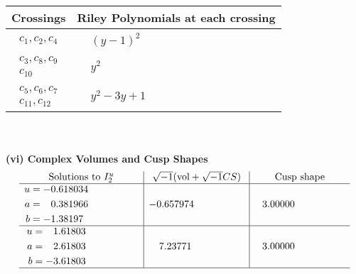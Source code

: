 \documentclass[1p]{elsarticle_modified}
\theoremstyle{definition}
\newcommand{\I}{\sqrt{-1}}
\begin{document}
\begin{tabular}{m{50pt}|m{274pt}}
Crossings & \hspace{64pt}Riley Polynomials at each crossing \\
\hline $$\begin{aligned}c_{1},c_{2},c_{4}\end{aligned}$$&$\begin{aligned}
&(y-1)^2
\end{aligned}$\\
\hline $$\begin{aligned}c_{3},c_{8},c_{9}\\c_{10}\end{aligned}$$&$\begin{aligned}
&y^2
\end{aligned}$\\
\hline $$\begin{aligned}c_{5},c_{6},c_{7}\\c_{11},c_{12}\end{aligned}$$&$\begin{aligned}
&y^2-3 y+1
\end{aligned}$\\
\hline
\end{tabular}\\~\\
\newpage\flushleft \textbf{(vi) Complex Volumes and Cusp Shapes}
$$\begin{array}{c|c|c}  
\text{Solutions to }I^u_{2}& \I (\text{vol} + \sqrt{-1}CS) & \text{Cusp shape}\\
 \hline 
\begin{aligned}
u &= -0.618034\phantom{ +0.000000I} \\
a &= \phantom{-}0.381966\phantom{ +0.000000I} \\
b &= -1.38197\phantom{ +0.000000I}\end{aligned}
 & -0.657974\phantom{ +0.000000I} & \phantom{-}3.00000\phantom{ +0.000000I} \\ \hline\begin{aligned}
u &= \phantom{-}1.61803\phantom{ +0.000000I} \\
a &= \phantom{-}2.61803\phantom{ +0.000000I} \\
b &= -3.61803\phantom{ +0.000000I}\end{aligned}
 & \phantom{-}7.23771\phantom{ +0.000000I} & \phantom{-}3.00000\phantom{ +0.000000I}\\
 \hline 
 \end{array}$$\newpage
\newpage\renewcommand{\arraystretch}{1}
\end{document}
